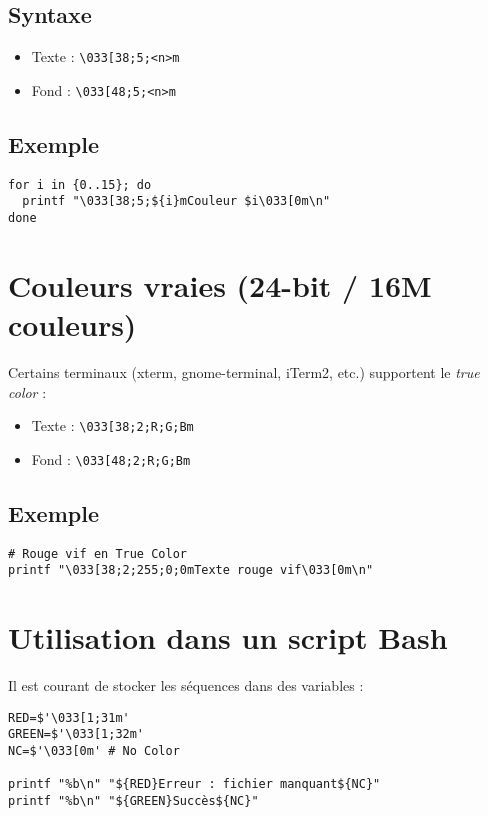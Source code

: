 \documentclass[11pt,a4paper]{article}
\begin{document}
\subsection*{Syntaxe}
\begin{itemize}
  \item Texte : \verb|\033[38;5;<n>m|
  \item Fond : \verb|\033[48;5;<n>m|
\end{itemize}

\subsection*{Exemple}
\begin{lstlisting}
for i in {0..15}; do
  printf "\033[38;5;${i}mCouleur $i\033[0m\n"
done
\end{lstlisting}

\section{Couleurs vraies (24-bit / 16M couleurs)}
Certains terminaux (xterm, gnome-terminal, iTerm2, etc.) supportent le \emph{true color} :

\begin{itemize}
  \item Texte : \verb|\033[38;2;R;G;Bm|
  \item Fond : \verb|\033[48;2;R;G;Bm|
\end{itemize}

\subsection*{Exemple}
\begin{lstlisting}
# Rouge vif en True Color
printf "\033[38;2;255;0;0mTexte rouge vif\033[0m\n"
\end{lstlisting}

\section{Utilisation dans un script Bash}
Il est courant de stocker les séquences dans des variables :

\begin{lstlisting}
RED=$'\033[1;31m'
GREEN=$'\033[1;32m'
NC=$'\033[0m' # No Color

printf "%b\n" "${RED}Erreur : fichier manquant${NC}"
printf "%b\n" "${GREEN}Succès${NC}"
\end{lstlisting}
\end{document}
